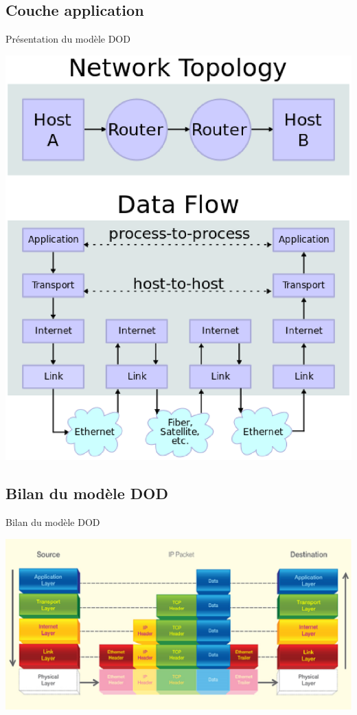 \begin{frame}\frametitle{}
    \subsection{Couche application}
    {\Huge Présentation du modèle DOD}

    \includegraphics[scale=0.35]{res/DodConnect.eps}

\end{frame}

\begin{frame}\frametitle{}
    \subsection{Bilan du modèle DOD}
    {\Huge Bilan du modèle DOD}

    \includegraphics[scale=0.75]{res/DodExplain.eps}

\end{frame}


